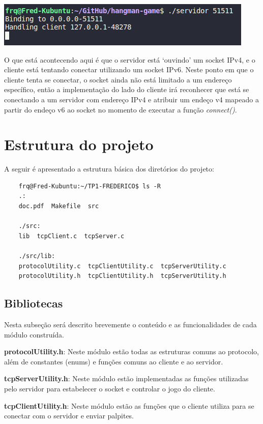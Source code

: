 \documentclass[12pt]{article}
\begin{document}
\begin{center}
    \includegraphics{Figura5.png}
\end{center}

O que está acontecendo aqui é que o servidor está `ouvindo' um socket IPv4, e o cliente está tentando conectar utilizando um socket IPv6.
Neste ponto em que o cliente tenta se conectar, o socket ainda não está limitado a um endereço específico, então a implementação do lado do cliente irá reconhecer que está se conectando a um servidor com endereço IPv4
e atribuir um endeço v4 mapeado a partir do endeço v6 ao socket no momento de executar a função \emph{connect()}.

\newpage
\section{Estrutura do projeto}

A seguir é apresentado a estrutura básica dos diretórios do projeto:
\vspace{1em}
\begin{lstlisting}
    frq@Fred-Kubuntu:~/TP1-FREDERICO$ ls -R
    .:
    doc.pdf  Makefile  src
    
    ./src:
    lib  tcpClient.c  tcpServer.c
    
    ./src/lib:
    protocolUtility.c  tcpClientUtility.c  tcpServerUtility.c
    protocolUtility.h  tcpClientUtility.h  tcpServerUtility.h    
\end{lstlisting}
\vspace{1em}

\subsection{Bibliotecas}

Nesta subseção será descrito brevemente o conteúdo e as funcionalidades de cada módulo construída. \par

\textbf{protocolUtility.h}: Neste módulo estão todas as estruturas comuns ao protocolo, além de constantes (enums) e funções comuns ao cliente e ao servidor. \par
\textbf{tcpServerUtility.h}: Neste módulo estão implementadas as funções utilizadas pelo servidor para estabelecer o socket e controlar o jogo do cliente. \par
\textbf{tcpClientUtility.h}: Neste módulo estão as funções que o cliente utiliza para se conectar com o servidor e enviar palpites.
\end{document}
